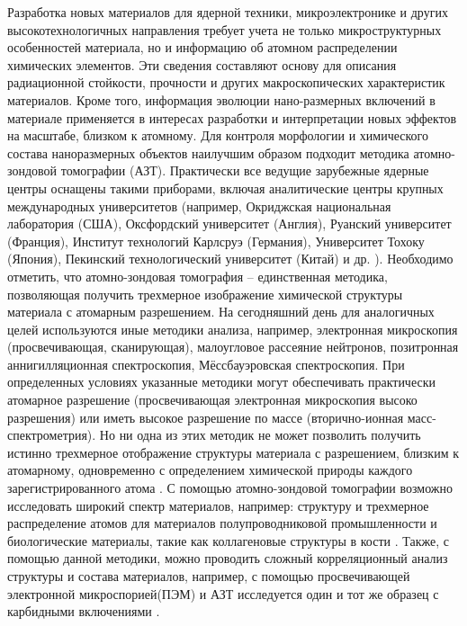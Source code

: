
{\actuality} Разработка новых материалов для ядерной техники, микроэлектронике и других высокотехнологичных направления требует учета не только микроструктурных особенностей материала, но и информацию об атомном распределении химических элементов. Эти сведения составляют основу для описания радиационной стойкости, прочности и других макроскопических характеристик материалов. Кроме того, информация эволюции нано-размерных включений в материале применяется в интересах разработки и интерпретации новых эффектов на масштабе, близком к атомному.
Для контроля морфологии и химического состава наноразмерных объектов наилучшим образом подходит методика атомно-зондовой томографии (АЗТ). Практически все ведущие зарубежные ядерные центры оснащены такими приборами, включая аналитические центры крупных международных университетов (например, Окриджская национальная лаборатория (США), Оксфордский университет (Англия), Руанский университет (Франция), Институт технологий Карлсруэ (Германия), Университет Тохоку (Япония), Пекинский технологический университет (Китай) и др. \cite{APTlist}). Необходимо отметить, что атомно-зондовая томография – единственная методика, позволяющая получить трехмерное изображение химической структуры материала с атомарным разрешением. На сегодняшний день для аналогичных целей используются иные методики анализа, например, электронная микроскопия (просвечивающая, сканирующая), малоугловое рассеяние нейтронов, позитронная аннигилляционная спектроскопия, Мёссбауэровская спектроскопия. При определенных условиях указанные методики могут обеспечивать практически атомарное разрешение (просвечивающая электронная микроскопия высоко разрешения) или иметь высокое разрешение по массе (вторично-ионная масс-спектрометрия). Но ни одна из этих методик не может позволить получить истинно трехмерное отображение структуры материала с разрешением, близким к атомарному, одновременно с определением химической природы каждого зарегистрированного атома \cite{GaultBOOK}. С помощью атомно-зондовой томографии возможно исследовать широкий спектр материалов, например: структуру и трехмерное распределение атомов для материалов полупроводниковой промышленности \cite{Ulfig23} и биологические материалы, такие как коллагеновые структуры в кости \cite{Lee21}. Также, с помощью данной методики, можно проводить сложный корреляционный анализ структуры и состава материалов, например, с помощью просвечивающей электронной микроспорией(ПЭМ) и АЗТ исследуется один и тот же образец с карбидными включениями \cite{Liebscher18}.
